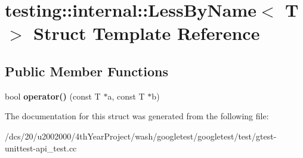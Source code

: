 \hypertarget{structtesting_1_1internal_1_1LessByName}{}\section{testing\+:\+:internal\+:\+:Less\+By\+Name$<$ T $>$ Struct Template Reference}
\label{structtesting_1_1internal_1_1LessByName}
\subsection*{Public Member Functions}
\begin{DoxyCompactItemize}
\item 
\mbox{\label{structtesting_1_1internal_1_1LessByName_a62386ac7750bfc035536be55d90a52eb}} 
bool {\bfseries operator()} (const T $\ast$a, const T $\ast$b)
\end{DoxyCompactItemize}


The documentation for this struct was generated from the following file\+:\begin{DoxyCompactItemize}
\item 
/dcs/20/u2002000/4th\+Year\+Project/wash/googletest/googletest/test/gtest-\/unittest-\/api\+\_\+test.\+cc\end{DoxyCompactItemize}
